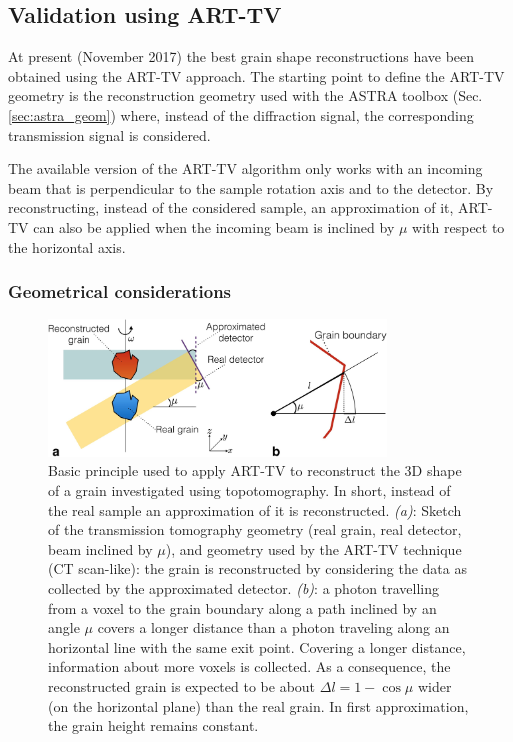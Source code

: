 \documentclass[11pt]{scrartcl}
\begin{document}
\subsection{Validation using ART-TV}

At present (November 2017) the best grain shape reconstructions have been obtained using the {\footnotesize{ART-TV}} approach. The starting point to define the {\footnotesize{ART-TV}} geometry is the reconstruction geometry used with the {\footnotesize{ASTRA}} toolbox (Sec. \ref{sec:astra_geom}) where, instead of the diffraction signal, the corresponding transmission signal is considered.

The available version of the {\footnotesize{ART-TV}} algorithm only works with an incoming beam that is perpendicular to the sample rotation axis and to the detector. By reconstructing, instead of the considered sample, an approximation of it, {\footnotesize{ART-TV}} can also be applied when the incoming beam is inclined by $\mu$ with respect to the horizontal axis.

\subsubsection{Geometrical considerations}

\begin{figure}
    \centering
    \includegraphics[width=0.8\textwidth]{geom_art_tv.png}
    \caption{Basic principle used to apply {\footnotesize{ART-TV}} to reconstruct the {\footnotesize{3D}} shape of a grain investigated using topotomography. In short, instead of the real sample an approximation of it is reconstructed. {\emph{(a)}}: Sketch of the transmission tomography geometry (real grain, real detector, beam inclined by $\mu$), and geometry used by the {\footnotesize{ART-TV}} technique ({\footnotesize{CT}} scan-like): the grain is reconstructed by considering the data as collected by the approximated detector. {\emph{(b)}}: a photon travelling from a voxel to the grain boundary along a path inclined by an angle $\mu$ covers a longer distance than a photon traveling along an horizontal line with the same exit point. Covering a longer distance, information about more voxels is collected. As a consequence, the reconstructed grain is expected to be about $\Delta l = 1-\cos\mu$ wider (on the horizontal plane) than the real grain. In first approximation, the grain height remains constant.}
    \label{fig:art_tv_geometry}
\end{figure}
\end{document}
